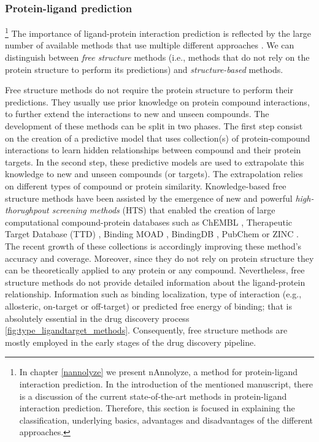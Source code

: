 \documentclass[12pt, b5paper,twoside]{tesi_upf}
\begin{document}
\subsubsection{Protein-ligand prediction}\label{prediction ligand-target}

\par  \footnote{In chapter \ref{nannolyze} we present nAnnolyze, a method for protein-ligand interaction prediction. In the introduction of the mentioned manuscript, there is a discussion of the current state-of-the-art methods in protein-ligand interaction prediction. Therefore, this section is focused in explaining the classification, underlying basics, advantages and disadvantages of the different approaches.} The importance of ligand-protein interaction prediction is reflected by the large number of available methods that use multiple different approaches \cite{Csermely2013, prathipati2015}. We can distinguish between \textit{free structure} methods (i.e., methods that do not rely on the protein structure to perform its predictions) and \textit{structure-based} methods.    
\par Free structure methods do not require the protein structure to perform their predictions. They usually use prior knowledge on protein compound interactions, to further extend the interactions to new and unseen compounds. The development of these methods can be split in two phases. The first step consist on the creation of a predictive model that uses collection(s) of protein-compound interactions to learn hidden relationships between compound and their protein targets.  In the second step, these predictive models are used to extrapolate this knowledge to new and unseen compounds (or targets). The extrapolation relies on different types of compound or protein similarity. Knowledge-based free structure methods have been assisted by the emergence of new and powerful \textit{high-thorughpout screening methods} (HTS) that enabled the creation of large computational compound-protein databases such as ChEMBL \cite{Bento2014}, Therapeutic Target Database (TTD) \cite{Zhu2012a}, Binding MOAD \cite{Hu2005}, BindingDB \cite{Liu2007}, PubChem \cite{Kim2016, Wang2014} or ZINC \cite{Irwin2012}. The recent growth of these collections is accordingly improving these method's accuracy and coverage. Moreover, since they do not rely on protein structure they can be theoretically applied to any protein or any compound. Nevertheless, free structure methods do not provide detailed information about the ligand-protein relationship. Information such as binding localization, type of interaction (e.g., allosteric, on-target or off-target) or predicted free energy of binding;  that is absolutely essential in the drug discovery process \ref{fig:type_ligandtarget_methods}. Consequently, free structure methods are mostly employed in the early stages of the drug discovery pipeline. 
\end{document}
